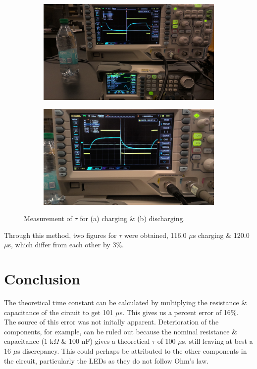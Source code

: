 \documentclass{article}
\begin{document}
        \begin{figure}[h]
            \begin{subfigure}{0.5\linewidth}
                \includegraphics[width=\linewidth]{tau charging.jpg}
                \caption{}
            \end{subfigure}
            \begin{subfigure}{0.5\linewidth}
                \includegraphics[width=\linewidth]{tau discharging.jpg}
                \caption{}
            \end{subfigure}
            \caption{Measurement of $\tau$ for (a) charging \& (b) discharging.}
            \label{measuringtau}
        \end{figure}

    Through this method, two figures for $\tau$ were obtained, 116.0 $\mu$s charging \& 120.0 $\mu$s, which differ from each other by 3\%.


\section{Conclusion}
    The theoretical time constant can be calculated by multiplying the resistance \& capacitance of the circuit to get 101 $\mu$s. This gives us a percent error of 16\%.\\
    
    The source of this error was not initally apparent. Deterioration of the components, for example, can be ruled out because the nominal resistance \& capacitance (1 k$\Omega$ \& 100 nF) gives a theoretical $\tau$ of 100 $\mu$s, still leaving at best a 16 $\mu$s discrepancy. This could perhaps be attributed to the other components in the circuit, particularly the LEDs as they do not follow Ohm's law.
\end{document}
